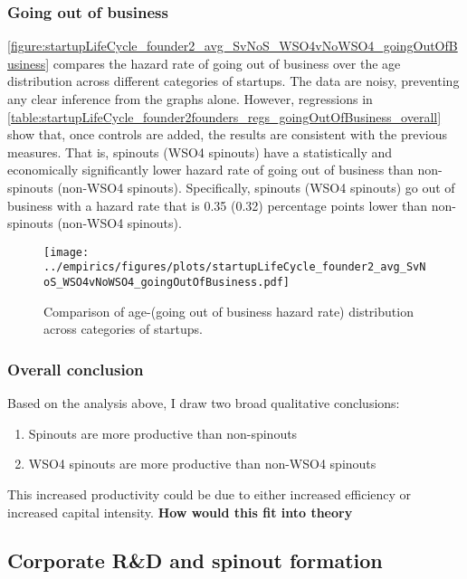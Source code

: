 \documentclass[12pt,english]{article}
\theoremstyle{remark}
\begin{document}
\subsubsection{Going out of business}

\autoref{figure:startupLifeCycle_founder2_avg_SvNoS_WSO4vNoWSO4_goingOutOfBusiness} compares the hazard rate of going out of business over the age distribution across different categories of startups. The data are noisy, preventing any clear inference from the graphs alone. However, regressions in \autoref{table:startupLifeCycle_founder2founders_regs_goingOutOfBusiness_overall} show that, once controls are added, the results are consistent with the previous measures. That is, spinouts (WSO4 spinouts) have a statistically and economically significantly lower hazard rate of going out of business than non-spinouts (non-WSO4 spinouts). Specifically, spinouts (WSO4 spinouts) go out of business with a hazard rate that is 0.35 (0.32) percentage points lower than non-spinouts (non-WSO4 spinouts). 


\begin{figure}[]
	\centering
	\texttt{[image: ../empirics/figures/plots/startupLifeCycle\_founder2\_avg\_SvNoS\_WSO4vNoWSO4\_goingOutOfBusiness.pdf]}
	\caption{Comparison of age-(going out of business hazard rate) distribution across categories of startups.}
	\label{figure:startupLifeCycle_founder2_avg_SvNoS_WSO4vNoWSO4_goingOutOfBusiness}
\end{figure}


\subsubsection{Overall conclusion}

Based on the analysis above, I draw two broad qualitative conclusions:

\begin{enumerate}
	\item Spinouts are more productive than non-spinouts
	\item WSO4 spinouts are more productive than non-WSO4 spinouts
\end{enumerate}

This increased productivity could be due to either increased efficiency or increased capital intensity. \textbf{How would this fit into theory}

\subsection{Corporate R\&D and spinout formation}
\end{document}
